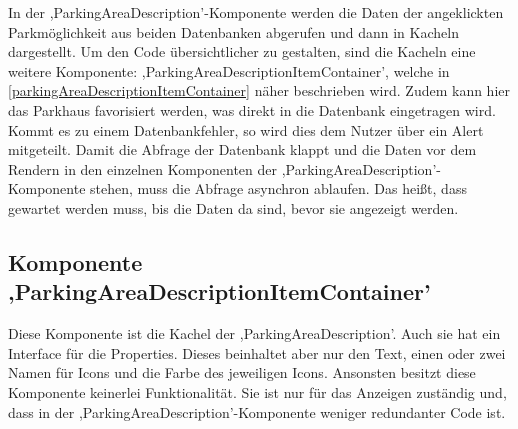 In der ,ParkingAreaDescription'-Komponente werden die Daten der angeklickten Parkmöglichkeit aus beiden Datenbanken abgerufen und dann in Kacheln dargestellt. Um den Code übersichtlicher zu gestalten, sind die Kacheln eine weitere Komponente: ,ParkingAreaDescriptionItemContainer', welche in \autoref{parkingAreaDescriptionItemContainer} näher beschrieben wird. Zudem kann hier das Parkhaus favorisiert werden, was direkt in die Datenbank eingetragen wird. Kommt es zu einem Datenbankfehler, so wird dies dem Nutzer über ein Alert mitgeteilt. Damit die Abfrage der Datenbank klappt und die Daten vor dem Rendern in den einzelnen Komponenten der ,ParkingAreaDescription'-Komponente stehen, muss die Abfrage asynchron ablaufen. Das heißt, dass gewartet werden muss, bis die Daten da sind, bevor sie angezeigt werden.

\subsection{Komponente ,ParkingAreaDescriptionItemContainer'}
\label{parkingAreaDescriptionItemContainer}
Diese Komponente ist die Kachel der ,ParkingAreaDescription'. Auch sie hat ein Interface für die Properties. Dieses beinhaltet aber nur den Text, einen oder zwei Namen für Icons und die Farbe des jeweiligen Icons. Ansonsten besitzt diese Komponente keinerlei Funktionalität. Sie ist nur für das Anzeigen zuständig und, dass in der ,ParkingAreaDescription'-Komponente weniger redundanter Code ist.

